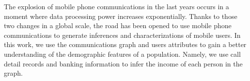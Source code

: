 The explosion of mobile phone communications in the last years occurs in a moment where data processing power increases exponentially.  Thanks to those two changes in a global scale, the road has been opened to use mobile phone communications to generate inferences and characterizations of mobile users.
In this work, we use the communications graph and users attributes to gain a better understanding of the demographic features of a population. Namely, we use 
call detail records and banking information to infer the income of each person in the graph.

